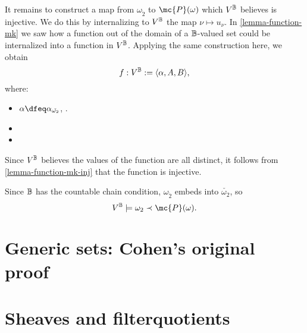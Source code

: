 \documentclass[11pt]{article}
\begin{document}
It remains to construct a map from $\omega_{\check{2}}$ to $\mc{P}(\omega)$ which $V^{\mathbb{B}}$ believes is injective. We do this by internalizing to $V^{\mathbb{B}}$ the map $\nu \mapsto u_{\nu}$. In \ref{lemma-function-mk} we saw how a function out of the domain of a $\mathbb{B}$-valued set could be internalized into a function in $V^{\mathbb{B}}$. Applying the same construction here, we obtain
$$
f : V^{\mathbb{B}} := \langle \alpha, A, B \rangle,
$$
where:
\begin{itemize}
\item $\alpha \dfeq \alpha_{\check{\omega_2}}$, .
\item {}
\item {}
\end{itemize}

Since $V^{\mathbb{B}}$ believes the values of the function are all distinct, it follows from \ref{lemma-function-mk-inj} that the function is injective.

Since $\mathbb{B}$ has the countable chain condition, $\omega_{\check{2}}$ embeds into $\check{\omega_2}$, so
$$
V^\B \models \omega_2 \prec \mc{P}(\omega).
$$


\section{Generic sets: Cohen's original proof}

\section{Sheaves and filterquotients}
\end{document}
